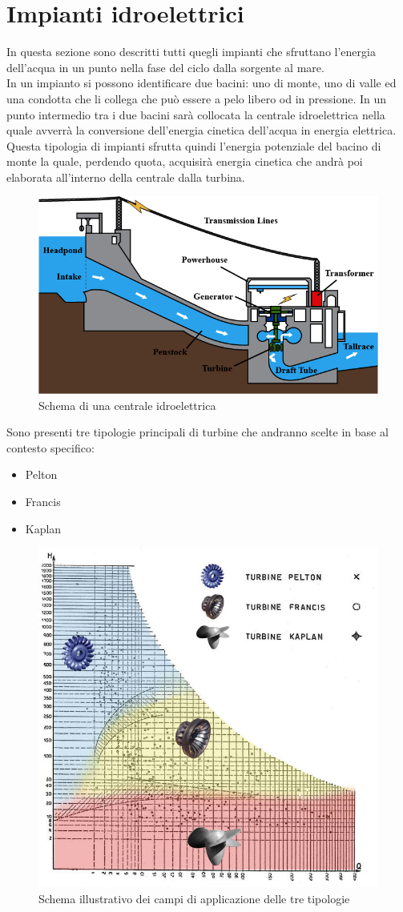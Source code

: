 \section{Impianti idroelettrici}
In questa sezione sono descritti tutti quegli impianti che sfruttano l'energia dell'acqua in un punto nella fase del ciclo dalla sorgente al mare.\\
In un impianto si possono identificare due bacini: uno di monte, uno di valle ed una condotta che li collega che può essere a pelo libero od in pressione. In un punto intermedio tra i due bacini sarà collocata la centrale idroelettrica nella quale avverrà la conversione dell'energia cinetica dell'acqua in energia elettrica.\\
Questa tipologia di impianti sfrutta quindi l'energia potenziale del bacino di monte la quale, perdendo quota, acquisirà energia cinetica che andrà poi elaborata all'interno della centrale dalla turbina.\\
\begin{figure}[H]
    \centering
    \includegraphics[height=0.4\textwidth]{res/cap 3/hpp diagram}
    \caption{Schema di una centrale idroelettrica}
\end{figure}\noindent
Sono presenti tre tipologie principali di turbine che andranno scelte in base al contesto specifico:
\begin{itemize}
    \item Pelton
    \item Francis
    \item Kaplan
\end{itemize}
\vfill
\newpage
\begin{figure}[H]
    \centering
    \includegraphics[height=0.4\textwidth]{res/cap 3/1_Campi-applicazione}
    \caption{Schema illustrativo dei campi di applicazione delle tre tipologie}
\end{figure}\noindent
